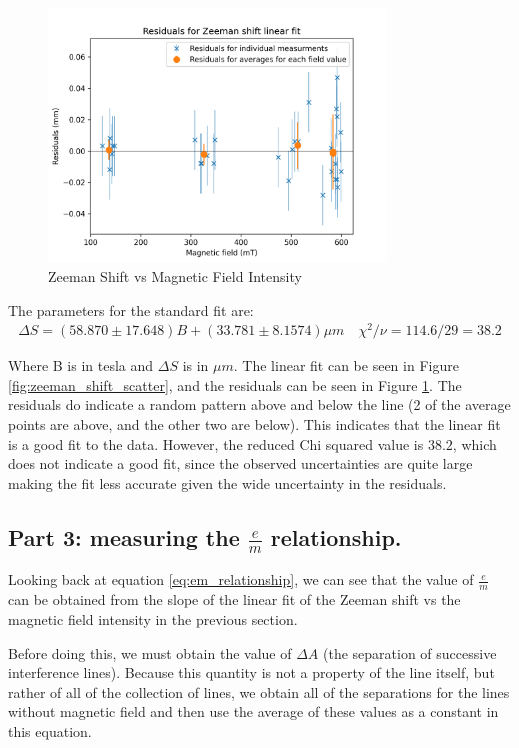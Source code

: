 \begin{figure}
    \centering
    \includegraphics[width=0.8\textwidth]{Results/img/zeeman_shift_residuals.png}
    \caption{Zeeman Shift vs Magnetic Field Intensity}
    \label{fig:zeeman_shift_residuals}
\end{figure}

The parameters for the standard fit are:
\begin{gather*}
    \Delta S = (58.870 \pm 17.648)B + (33.781 \pm 8.1574) \mu m \quad \chi^2 / \nu = 114.6 / 29 = 38.2
\end{gather*}

Where B is in tesla and $\Delta S$ is in $\mu m$. The linear fit can be seen in Figure \ref{fig:zeeman_shift_scatter}, and the residuals can be seen in Figure \ref{fig:zeeman_shift_residuals}. The residuals do indicate a random
pattern above and below the line (2 of the average points are above, and the other two are below). This indicates that the linear fit is a good fit to the data.
However, the reduced Chi squared value is $38.2$, which does not indicate a good fit, since the observed uncertainties are quite large making the fit less accurate given the wide uncertainty in the residuals.
\subsection{Part 3: measuring the $\frac{e}{m}$ relationship.}

Looking back at equation \ref{eq:em_relationship}, we can see that the value of $\frac{e}{m}$ can be obtained from the slope of the linear fit of the Zeeman shift vs the magnetic field intensity in the previous section.

Before doing this, we must obtain the value of $\Delta A$ (the separation of successive interference lines). Because this quantity is not a property
of the line itself, but rather of all of the collection of lines, we obtain all of the separations for the lines without magnetic field
and then use the average of these values as a constant in this equation.

